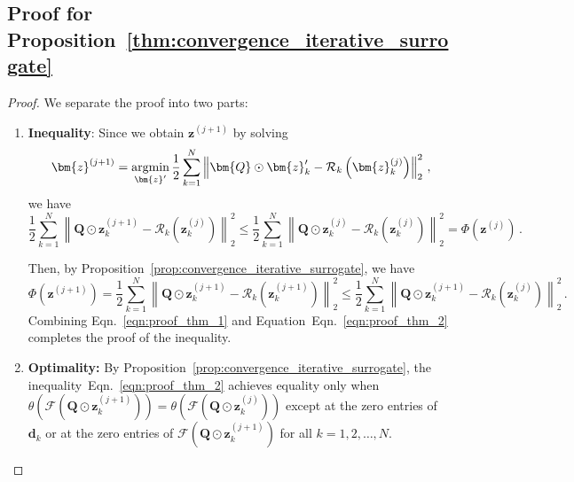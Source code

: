 \documentclass{article}
\numberwithin{equation}{section}
\begin{document}
\subsection{Proof for Proposition~\ref{thm:convergence_iterative_surrogate}}\label{app:proof_convergence_iterative_surrogate}

\begin{proof}
We separate the proof into two parts:
\begin{enumerate}
    \item \textbf{Inequality}: Since we obtain $\bm{z}^{(j+1)}$ by solving
    \begin{equation*}
        \bm{z}^{(j+1)} = \operatornamewithlimits{argmin}_{\bm{z}'} \frac{1}{2} \sum_{k=1}^N \left\|\bm{Q}\odot\bm{z}'_k - \mathcal{R}_k\left(\bm{z}^{(j)}_k\right)\right\|_2^2\,,
    \end{equation*}
    we have
    \begin{equation}\label{eqn:proof_thm_1}
        \frac{1}{2}\sum_{k=1}^N \left\|\bm{Q}\odot\bm{z}^{(j+1)}_k - \mathcal{R}_k\left(\bm{z}^{(j)}_k\right)\right\|_2^2 \leq \frac{1}{2}\sum_{k=1}^N \left\|\bm{Q}\odot\bm{z}^{(j)}_k - \mathcal{R}_k\left(\bm{z}^{(j)}_k\right)\right\|_2^2=\Phi\left(\bm{z}^{(j)}\right)\,.
    \end{equation}

    Then, by Proposition~\ref{prop:convergence_iterative_surrogate}, we have
    \begin{equation}\label{eqn:proof_thm_2}
        \Phi\left(\bm{z}^{(j+1)}\right)=\frac{1}{2}\sum_{k=1}^N \left\|\bm{Q}\odot\bm{z}^{(j+1)}_k - \mathcal{R}_k\left(\bm{z}^{(j+1)}_k\right)\right\|_2^2\leq\frac{1}{2}\sum_{k=1}^N \left\|\bm{Q}\odot\bm{z}^{(j+1)}_k - \mathcal{R}_k\left(\bm{z}^{(j)}_k\right)\right\|_2^2\,.
    \end{equation}
Combining Eqn.~\eqref{eqn:proof_thm_1} and Equation~Eqn.~\eqref{eqn:proof_thm_2} completes the proof of the inequality.
\item \textbf{Optimality:} By Proposition~\ref{prop:convergence_iterative_surrogate}, the inequality~Eqn.~\eqref{eqn:proof_thm_2} achieves equality only when $\theta\left(\mathcal{F}\left(\bm{Q}\odot \bm{z}_k^{(j+1)}\right)\right) = \theta\left(\mathcal{F}\left(\bm{Q}\odot \bm{z}_k^{(j)}\right)\right)$ except at the zero entries of $\bm{d}_k$ or at the zero entries of $\mathcal{F}\left(\bm{Q}\odot \bm{z}_k^{(j+1)}\right)$ for all $k=1,2,\dots,N$.


\end{enumerate}
\end{proof}
\end{document}
